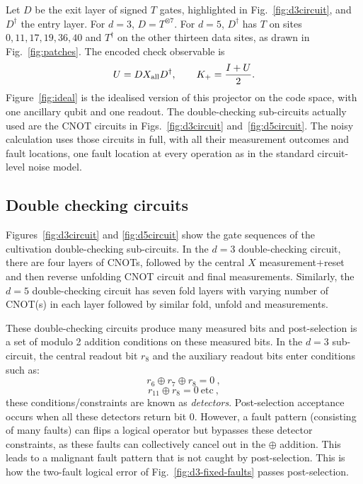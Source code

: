 Let $D$ be the exit layer of signed $T$ gates, highlighted in Fig.~\ref{fig:d3circuit}, and $D^\dagger$ the entry layer.
For $d=3$, $D=T^{\otimes7}$. For $d=5$, $D^\dagger$ has $T$ on
sites $0,11,17,19,36,40$ and $T^\dagger$ on the other thirteen data sites,
as drawn in Fig.~\ref{fig:patches}. The encoded check observable is
\begin{equation}
 U=D X_{\rm all}D^\dagger,\qquad K_+=\frac{I+U}{2}.
 \label{eq:idealU}
\end{equation}
Figure~\ref{fig:ideal} is the idealised version of this projector on the code space, with one ancillary qubit and one readout. The double-checking sub-circuits actually used are the CNOT circuits in Figs.~\ref{fig:d3circuit} and~\ref{fig:d5circuit}. The noisy calculation uses those circuits in full, with all their measurement outcomes and fault locations, one fault location at every operation as in the standard circuit-level noise model.


\subsection{Double checking circuits}
Figures~\ref{fig:d3circuit} and \ref{fig:d5circuit} show the gate sequences of the cultivation double-checking sub-circuits.
In the $d=3$ double-checking circuit, there are four layers of CNOTs, followed by the
central $X$ measurement$+$reset and then reverse unfolding CNOT circuit and final measurements.
Similarly, the $d=5$ double-checking circuit has seven fold layers with varying number of CNOT(s) in each layer followed by similar fold, unfold and measurements.




These double-checking circuits produce many measured bits and post-selection is a set of modulo 2 addition conditions on these measured bits. 
In the $d=3$ sub-circuit, the central readout bit $r_8$ and the auxiliary readout bits enter conditions such as:
\[r_6\oplus r_7\oplus r_8=0 \ , \]
\[r_{11}\oplus r_8=0 \ \text{etc} \ ,\]
these conditions/constraints are known as \textit{detectors}.
Post-selection acceptance occurs when all these detectors return bit 0. 
However, a fault pattern (consisting of many faults) can flips a logical operator but bypasses these detector constraints, as these faults can collectively cancel out in the $\oplus$ addition. 
This leads to a malignant fault pattern that is not caught by post-selection.
This is how the two-fault logical error of Fig.~\ref{fig:d3-fixed-faults} passes post-selection.

